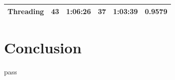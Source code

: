 \documentclass[12pt]{article}
\begin{document}
\begin{table}[ht]
{\begin{tabular}{|l|l|l|l|l|l|}
\textbf{Threading}       & 43                                                                       & 1:06:26                                                                        & 37                                                                                        & 1:03:39                                                                         & 0.9579                                                                           \\ \hline
\end{tabular}
}
\end{table}


\section{Conclusion}
pass

\pagebreak


\end{document}
